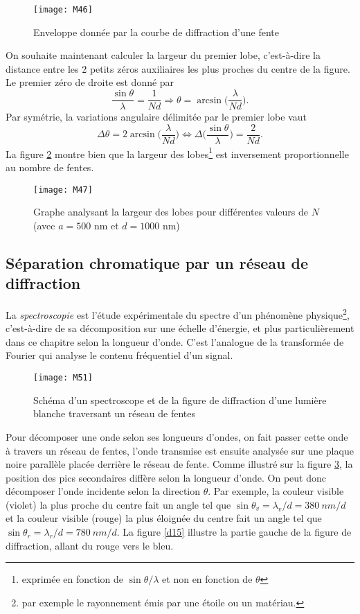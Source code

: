 \begin{figure}[h!]
    \centering
    \texttt{[image: M46]}
    \caption{Enveloppe donnée par la courbe de diffraction d'une fente}
    \label{d13}
\end{figure}

\noindent On souhaite maintenant calculer la largeur du premier lobe, c'est-à-dire la distance entre les 2 petits zéros auxiliaires les plus proches du centre de la figure. Le premier zéro de droite est donné par
$$
    \frac{\sin\theta}{\lambda}=\frac{1}{Nd}\Longrightarrow \theta=\arcsin\Big(\frac{\lambda}{Nd}\Big).
$$
Par symétrie, la variations angulaire délimitée par le premier lobe vaut
$$
    \Delta\theta=2\arcsin\Big(\frac{\lambda}{Nd}\Big) \Longleftrightarrow \Delta\Big(\frac{\sin\theta}{\lambda}\Big)=\frac{2}{Nd}.
$$
La figure \ref{d14} montre bien que la largeur des lobes\footnote{exprimée en fonction de $\sin\theta/\lambda$ et non en fonction de $\theta$} est inversement proportionnelle au nombre de fentes.

\begin{figure}[h!]
    \centering
    \texttt{[image: M47]}
    \caption{Graphe analysant la largeur des lobes pour différentes valeurs de $N$ (avec $a=500$ nm et $d=1000$ nm)}
    \label{d14}
\end{figure}

\subsection{Séparation chromatique par un réseau de diffraction}

La \textit{spectroscopie} est l'étude expérimentale du spectre d'un phénomène physique\footnote{par exemple le rayonnement émis par une étoile ou un matériau.}, c'est-à-dire de sa décomposition sur une échelle d'énergie, et plus particulièrement dans ce chapitre selon la longueur d'onde. C'est l'analogue de la transformée de Fourier qui analyse le contenu fréquentiel d'un signal.

\begin{figure}[h!]
    \centering
    \texttt{[image: M51]}
    \caption{Schéma d'un spectroscope et de la figure de diffraction d'une lumière blanche traversant un réseau de fentes}
    \label{d16}
\end{figure}

\noindent Pour décomposer une onde selon ses longueurs d'ondes, on fait passer cette onde à travers un réseau de fentes, l'onde transmise est ensuite analysée sur une plaque noire parallèle placée derrière le réseau de fente. Comme illustré sur la figure \ref{d16}, la position des pics secondaires diffère selon la longueur d'onde. On peut donc décomposer l'onde incidente selon la direction $\theta$. Par exemple, la couleur visible (violet) la plus proche du centre fait un angle tel que $\sin\theta_v=\lambda_v/d=380\:nm/d$ et la couleur visible (rouge) la plus éloignée du centre fait un angle tel que $\sin\theta_r=\lambda_r/d=780\:nm/d$. La figure \ref{d15} illustre la partie gauche de la figure de diffraction, allant du rouge vers le bleu.

